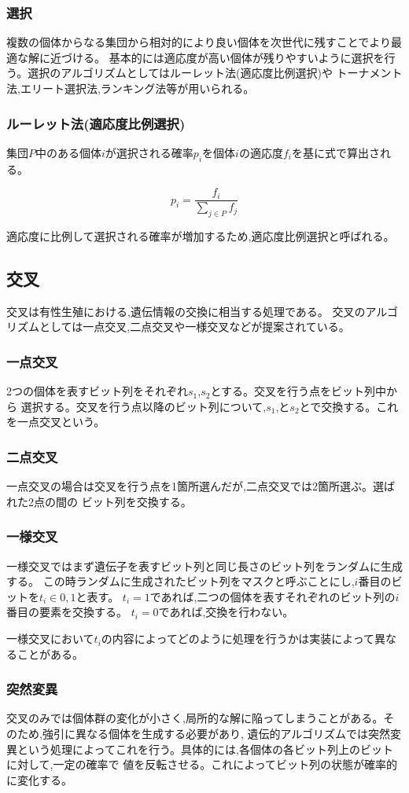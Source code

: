 \subsubsection{選択}
複数の個体からなる集団から相対的により良い個体を次世代に残すことでより最適な解に近づける。
基本的には適応度が高い個体が残りやすいように選択を行う。選択のアルゴリズムとしてはルーレット法(適応度比例選択)や
トーナメント法,エリート選択法,ランキング法等が用いられる。

\subsubsection{ルーレット法(適応度比例選択)}
集団$P$中のある個体$i$が選択される確率$p_i$を個体$i$の適応度$f_i$を基に式で算出される。

\begin{equation}
  p_i = \frac{f_i}{\sum_{j\in P} f_j}
\end{equation}

適応度に比例して選択される確率が増加するため,適応度比例選択と呼ばれる。

\subsection{交叉}
交叉は有性生殖における,遺伝情報の交換に相当する処理である。
交叉のアルゴリズムとしては一点交叉,二点交叉や一様交叉などが提案されている。

\subsubsection{一点交叉}
2つの個体を表すビット列をそれぞれ$s_1$,$s_2$とする。交叉を行う点をビット列中から
選択する。交叉を行う点以降のビット列について,$s_1$,と$s_2$とで交換する。これを一点交叉という。

\subsubsection{二点交叉}
一点交叉の場合は交叉を行う点を1箇所選んだが,二点交叉では2箇所選ぶ。選ばれた2点の間の
ビット列を交換する。

\subsubsection{一様交叉}
一様交叉ではまず遺伝子を表すビット列と同じ長さのビット列をランダムに生成する。
この時ランダムに生成されたビット列をマスクと呼ぶことにし,$i$番目のビットを$t_i \in {0, 1}$と表す。
$t_i = 1$であれば,二つの個体を表すそれぞれのビット列の$i$番目の要素を交換する。
$t_i = 0$であれば,交換を行わない。

一様交叉において$t_i$の内容によってどのように処理を行うかは実装によって異なることがある。

\subsubsection{突然変異}
交叉のみでは個体群の変化が小さく,局所的な解に陥ってしまうことがある。そのため,強引に異なる個体を生成する必要があり,
遺伝的アルゴリズムでは突然変異という処理によってこれを行う。具体的には,各個体の各ビット列上のビットに対して,一定の確率で
値を反転させる。これによってビット列の状態が確率的に変化する。

